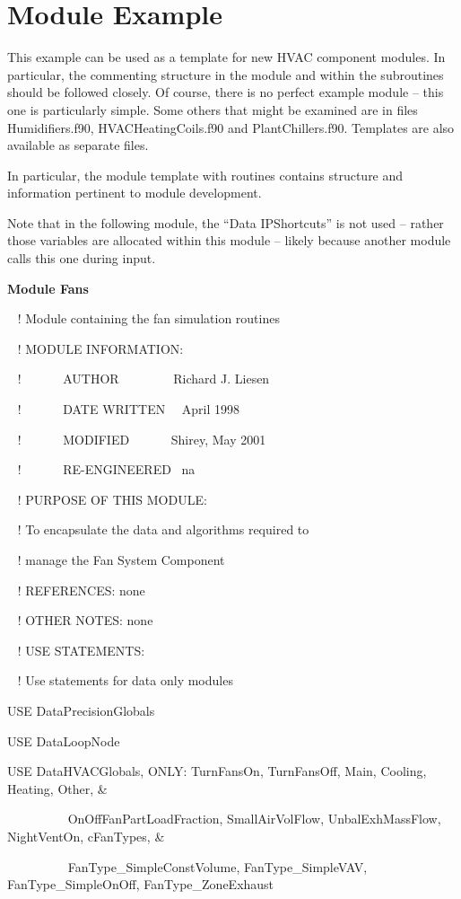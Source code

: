 \section{Module Example}\label{module-example}

This example can be used as a template for new HVAC component modules. In particular, the commenting structure in the module and within the subroutines should be followed closely. Of course, there is no perfect example module -- this one is particularly simple. Some others that might be examined are in files Humidifiers.f90, HVACHeatingCoils.f90 and PlantChillers.f90. Templates are also available as separate files.

In particular, the module template with routines contains structure and information pertinent to module development.

Note that in the following module, the ``Data IPShortcuts'' is not used -- rather those variables are allocated within this module -- likely because another module calls this one during input.

\textbf{Module Fans}

~ ! Module containing the fan simulation routines

~ ! MODULE INFORMATION:

~ !~~~~~~ AUTHOR~~~~~~~~ Richard J. Liesen

~ !~~~~~~ DATE WRITTEN~~ April 1998

~ !~~~~~~ MODIFIED~~~~~~ Shirey, May 2001

~ !~~~~~~ RE-ENGINEERED~ na

~ ! PURPOSE OF THIS MODULE:

~ ! To encapsulate the data and algorithms required to

~ ! manage the Fan System Component

~ ! REFERENCES: none

~ ! OTHER NOTES: none

~ ! USE STATEMENTS:

~ ! Use statements for data only modules

USE DataPrecisionGlobals

USE DataLoopNode

USE DataHVACGlobals, ONLY: TurnFansOn, TurnFansOff, Main, Cooling, Heating, Other, \&

~~~~~~~~~ OnOffFanPartLoadFraction, SmallAirVolFlow, UnbalExhMassFlow, NightVentOn, cFanTypes, \&

~~~~~~~~~ FanType\_SimpleConstVolume, FanType\_SimpleVAV, FanType\_SimpleOnOff, FanType\_ZoneExhaust

